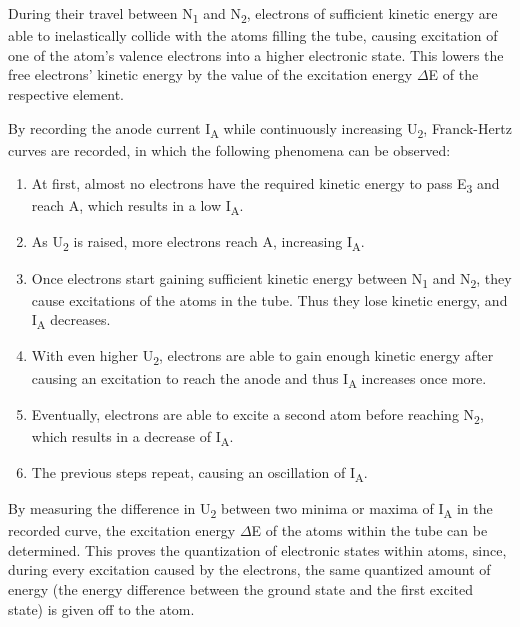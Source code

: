 \documentclass[titlepage]{article}
\begin{document}
During their travel between N\textsubscript{1} and N\textsubscript{2}, electrons of sufficient kinetic energy are able to inelastically collide with the atoms filling the tube, causing excitation of one of the atom's valence electrons into a higher electronic state. This lowers the free electrons' kinetic energy by the value of the excitation energy \(\Delta\)E of the respective element.

By recording the anode current I\textsubscript{A} while continuously increasing U\textsubscript{2}, Franck-Hertz curves are recorded, in which the following phenomena can be observed:

\begin{enumerate}
    \itemsep0em
    \item At first, almost no electrons have the required kinetic energy to pass E\textsubscript{3} and reach A, which results in a low I\textsubscript{A}.
    \item As U\textsubscript{2} is raised, more electrons reach A, increasing I\textsubscript{A}.
    \item Once electrons start gaining sufficient kinetic energy between N\textsubscript{1} and N\textsubscript{2}, they cause excitations of the atoms in the tube. Thus they lose kinetic energy, and I\textsubscript{A} decreases.
    \item With even higher U\textsubscript{2}, electrons are able to gain enough kinetic energy after causing an excitation to reach the anode and thus I\textsubscript{A} increases once more.
    \item Eventually, electrons are able to excite a second atom before reaching N\textsubscript{2}, which results in a decrease of I\textsubscript{A}.
    \item The previous steps repeat, causing an oscillation of I\textsubscript{A}.
\end{enumerate}

By measuring the difference in U\textsubscript{2} between two minima or maxima of I\textsubscript{A} in the recorded curve, the excitation energy \(\Delta\)E of the atoms within the tube can be determined. This proves the quantization of electronic states within atoms, since, during every excitation caused by the electrons, the same quantized amount of energy (the energy difference between the ground state and the first excited state) is given off to the atom.
\end{document}
